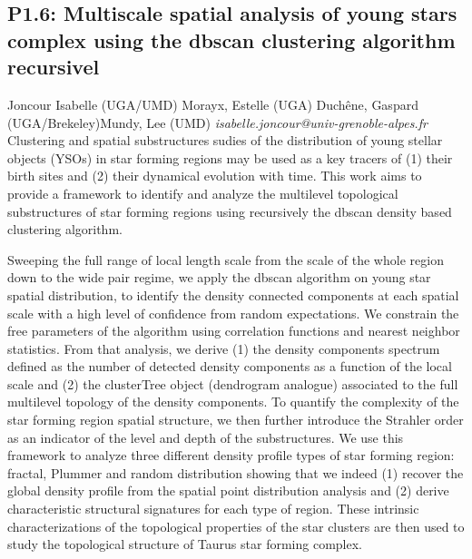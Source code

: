 \documentclass{report}
\begin{document}
\subsection*{P1.6: Multiscale spatial analysis of young stars complex using the dbscan clustering algorithm recursivel}
\bigskip
Joncour  Isabelle (UGA/UMD) \newline Morayx, Estelle (UGA) \newline  Duchêne, Gaspard (UGA/Brekeley)\newline  Mundy, Lee (UMD)\newline  \newline  \newline\newline
{\it isabelle.joncour@univ-grenoble-alpes.fr}\newline
\newline\newline
Clustering  and spatial substructures sudies of the distribution of  young stellar objects (YSOs) in star forming regions may be used as a key tracers of (1) their birth  sites and (2) their dynamical evolution with time. This work aims to provide a framework to identify and analyze  the multilevel topological substructures of star forming regions using recursively the dbscan density based clustering algorithm.

Sweeping the full range of local length scale from the scale of the whole region down to the wide pair regime, we apply the dbscan algorithm on young star spatial distribution, to identify the density connected components at each spatial scale with a high level of confidence from random expectations. We constrain the free parameters of the algorithm using correlation functions and nearest neighbor statistics. From that analysis, we derive (1) the density components spectrum defined as the number of detected density components as a function of the local scale and (2) the clusterTree object (dendrogram analogue) associated to the full multilevel topology of the density components.  To quantify the complexity of the star forming region spatial structure, we then further introduce the Strahler order as an indicator of the level and depth of the substructures.
  We use this framework to analyze three different density profile types of star forming region: fractal, Plummer and random distribution  showing that we indeed (1) recover the global density profile from the spatial point distribution analysis and (2) derive characteristic structural signatures for each type of region. These intrinsic characterizations of the topological properties of the star clusters are then used to study the topological structure of Taurus star forming complex.\newline
\newpage
\end{document}
